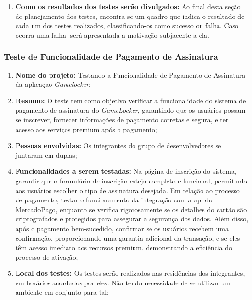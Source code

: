 \begin{enumerate}
\item{\textbf{Como os resultados dos testes serão divulgados:}}
Ao final desta seção de planejamento dos testes, encontra-se um quadro que indica o resultado de cada um dos testes realizados, classificando-os como sucesso ou falha. Caso ocorra uma falha, será apresentada a motivação subjacente a ela.
\end{enumerate}

\subsubsection{Teste de Funcionalidade de Pagamento de Assinatura}

\begin{enumerate}

\item{\textbf{Nome do projeto:}}
Testando a Funcionalidade de Pagamento de Assinatura da aplicação \textit{Gamelocker};

\item{\textbf{Resumo:}}
O teste tem como objetivo verificar a funcionalidade do sistema de pagamento de assinatura do \textit{GameLocker}, garantindo que os usuários possam se inscrever, fornecer informações de pagamento corretas e segura, e ter acesso aos serviços premium após o pagamento;

\item{\textbf{Pessoas envolvidas:}}
Os integrantes do grupo de desenvolvedores se juntaram em duplas;

\item{\textbf{Funcionalidades a serem testadas:}}
Na página de inscrição do sistema, garantir que o formulário de inscrição esteja completo e funcional, permitindo aos usuários escolher o tipo de assinatura desejada. Em relação ao processo de pagamento, testar o funcionamento da integração com a \gls{api} do \gls{MercadoPago}, enquanto se verifica rigorosamente se os detalhes do cartão são criptografados e protegidos para assegurar a segurança dos dados. Além disso, após o pagamento bem-sucedido, confirmar se os usuários recebem uma confirmação, proporcionando uma garantia adicional da transação, e se eles têm acesso imediato aos recursos premium, demonstrando a eficiência do processo de ativação;

\item{\textbf{Local dos testes:}}
Os testes serão realizados nas residências dos integrantes, em horários acordados por eles. Não tendo necessidade de se utilizar um ambiente em conjunto para tal;


\end{enumerate}
